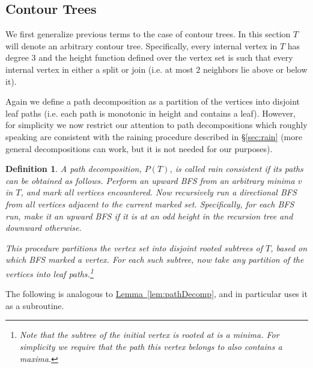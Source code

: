 \documentclass[11pt]{article}
\newtheorem{definition}[theorem]{Definition}
\theoremstyle{definition}
\newcommand{\Sec}[1]{\hyperref[sec:#1]{\S\ref*{sec:#1}}} %
\newcommand{\Lem}[1]{\hyperref[lem:#1]{Lemma~\ref*{lem:#1}}} %
\begin{document}
\subsection{Contour Trees}
We first generalize previous terms to the case of contour trees.
In this section $T$ will denote an arbitrary contour tree.  Specifically, every internal vertex in $T$ has degree $3$ 
and the height function defined over the vertex set is such that every internal vertex in either a split or join 
(i.e. at most $2$ neighbors lie above or below it).

Again we define a path decomposition as a partition of the vertices into 
disjoint leaf paths (i.e. each path is monotonic in height and contains a leaf). 
However, for simplicity we now restrict our attention to path decompositions which 
roughly speaking are consistent with the raining procedure described in \Sec{rain} 
(more general decompositions can work, but it is not needed for our purposes).

\begin{definition}
\label{def:path2} A path decomposition, $P(T)$, is called \emph{rain consistent} if its paths can be obtained as follows.
Perform an upward BFS from an arbitrary minima $v$ in $T$, and mark all vertices encountered.  
Now recursively run a directional BFS from all vertices adjacent to the current marked set.  
Specifically, for each BFS run, make it an upward BFS if it is at an odd height in the recursion tree and downward otherwise.  

This procedure partitions the vertex set into disjoint rooted subtrees of $T$, based on which BFS marked a vertex.  
For each such subtree, now take any partition of the vertices into leaf paths.\footnote{Note that the subtree  
of the initial vertex is rooted at is a minima.  For simplicity we require that the path this vertex belongs to 
also contains a maxima.}
\end{definition}


The following is analogous to \Lem{pathDecomp}, and in particular uses it as a subroutine.
\end{document}
